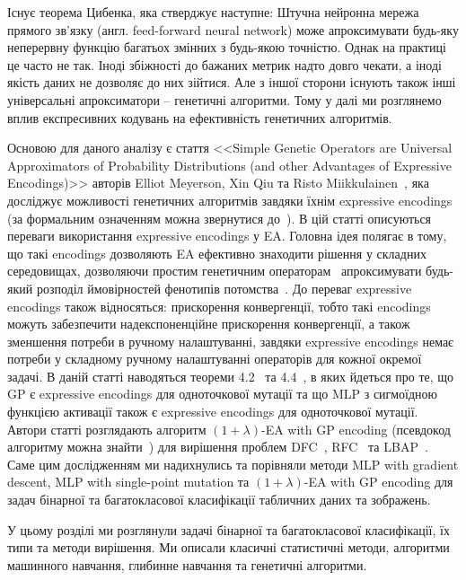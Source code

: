 Існує теорема Цибенка, яка стверджує наступне: Штучна нейронна мережа прямого зв'язку (англ. feed-forward neural network) може апроксимувати будь-яку неперервну функцію багатьох змінних з будь-якою точністю. Однак на практиці це часто не так. Іноді збіжності до бажаних метрик надто довго чекати, а іноді якість даних не дозволяє до них зійтися. Але з іншої сторони існують також інші універсальні апроксиматори -- генетичні алгоритми. Тому у далі ми розглянемо вплив експресивних кодувань на ефективність генетичних алгоритмів. 

Основою для даного аналізу є стаття <<Simple Genetic Operators are Universal Approximators of Probability Distributions (and other Advantages of Expressive Encodings)>> авторів Elliot Meyerson, Xin Qiu та Risto Miikkulainen~\cite{ct25}, яка досліджує можливості генетичних алгоритмів завдяки їхнім expressive encodings (за формальним означенням можна звернутися до~\cite[Definition 1, стор. 3]{ct25}). В цій статті описуються переваги використання expressive encodings у EA. Головна ідея полягає в тому, що такі encodings дозволяють EA ефективно знаходити рішення у складних середовищах, дозволяючи простим генетичним операторам~\cite[підрозділ 2.2.3, стор. 3]{ct25} апроксимувати будь-який розподіл ймовірностей фенотипів потомства~\cite[розділ 2.1, стор. 2]{ct25}. До переваг expressive encodings також відносяться: прискорення конвергенції, тобто такі encodings можуть забезпечити надекспоненційне прискорення конвергенції, а також зменшення потреби в ручному налаштуванні, завдяки expressive encodings немає потреби у складному ручному налаштуванні операторів для кожної окремої задачі. В даній статті наводяться теореми 4.2~\cite[Theorem 4.2]{ct25} та 4.4~\cite[Theorem 4.4]{ct25}, в яких йдеться про те, що GP є expressive encodings для одноточкової мутації та що MLP з сигмоїдною функцією активації також є expressive encodings для одноточкової мутації. Автори статті розглядають алгоритм $(1+\lambda)$-EA with GP encoding (псевдокод алгоритму можна знайти~\cite[Appendix B, стор. 12]{ct25}) для вирішення проблем DFC~\cite[Problem 1, стор. 6]{ct25}, RFC~\cite[Problem 2, стор. 7]{ct25} та LBAP~\cite[Problem 3, стор. 7]{ct25}. Саме цим дослідженням ми надихнулись та порівняли методи MLP with gradient descent, MLP with single-point mutation та $(1+\lambda)$-EA with GP encoding для задач бінарної та багатокласової класифікації табличних даних та зображень.

\chapconclude{\ref{chap:review}}

У цьому розділі ми розглянули задачі бінарної та багатокласової класифікації, їх типи та методи вирішення. Ми описали класичні статистичні методи, алгоритми машинного навчання, глибинне навчання та генетичні алгоритми.

